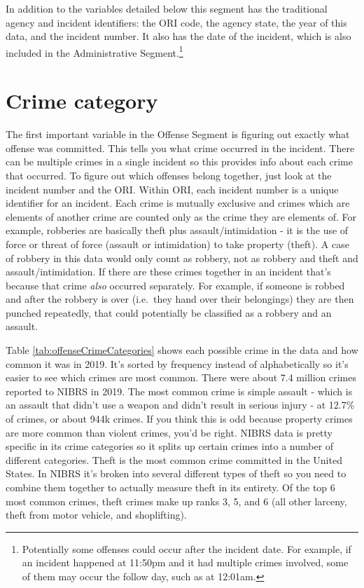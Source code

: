 \documentclass[
  12pt,
  openany]{book}
\begin{document}
In addition to the variables detailed below this segment has the traditional agency and incident identifiers: the ORI code, the agency state, the year of this data, and the incident number. It also has the date of the incident, which is also included in the Administrative Segment.\footnote{Potentially some offenses could occur after the incident date. For example, if an incident happened at 11:50pm and it had multiple crimes involved, some of them may occur the follow day, such as at 12:01am.}

\section{Crime category}\label{crime-category}

The first important variable in the Offense Segment is figuring out exactly what offense was committed. This tells you what crime occurred in the incident. There can be multiple crimes in a single incident so this provides info about each crime that occurred. To figure out which offenses belong together, just look at the incident number and the ORI. Within ORI, each incident number is a unique identifier for an incident. Each crime is mutually exclusive and crimes which are elements of another crime are counted only as the crime they are elements of. For example, robberies are basically theft plus assault/intimidation - it is the use of force or threat of force (assault or intimidation) to take property (theft). A case of robbery in this data would only count as robbery, not as robbery and theft and assault/intimidation. If there are these crimes together in an incident that's because that crime \emph{also} occurred separately. For example, if someone is robbed and after the robbery is over (i.e.~they hand over their belongings) they are then punched repeatedly, that could potentially be classified as a robbery and an assault.

Table \ref{tab:offenseCrimeCategories} shows each possible crime in the data and how common it was in 2019. It's sorted by frequency instead of alphabetically so it's easier to see which crimes are most common. There were about 7.4 million crimes reported to NIBRS in 2019. The most common crime is simple assault - which is an assault that didn't use a weapon and didn't result in serious injury - at 12.7\% of crimes, or about 944k crimes. If you think this is odd because property crimes are more common than violent crimes, you'd be right. NIBRS data is pretty specific in its crime categories so it splits up certain crimes into a number of different categories. Theft is the most common crime committed in the United States. In NIBRS it's broken into several different types of theft so you need to combine them together to actually measure theft in its entirety. Of the top 6 most common crimes, theft crimes make up ranks 3, 5, and 6 (all other larceny, theft from motor vehicle, and shoplifting).
\end{document}
